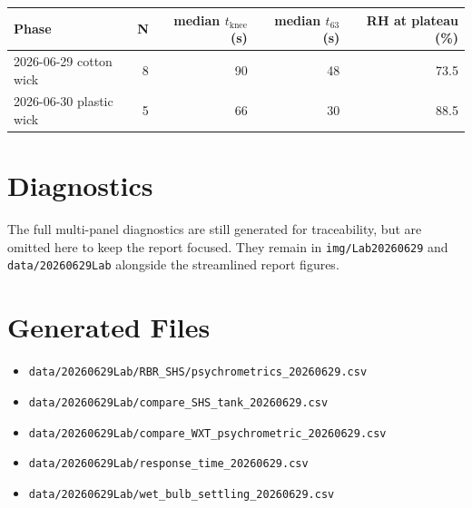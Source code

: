 \documentclass[11pt,letterpaper]{article}
\begin{document}
\begin{center}
\begin{tabular}{lrrrr}
\toprule
Phase & N & median $t_\text{knee}$ (s) & median $t_{63}$ (s) & RH at plateau (\%) \\
\midrule
2026-06-29 cotton wick & 8 & 90 & 48 & 73.5 \\
2026-06-30 plastic wick & 5 & 66 & 30 & 88.5 \\
\bottomrule
\end{tabular}
\end{center}

\section{Diagnostics}

The full multi-panel diagnostics are still generated for traceability, but are
omitted here to keep the report focused. They remain in
\texttt{img/Lab20260629} and \texttt{data/20260629Lab} alongside the
streamlined report figures.

\section{Generated Files}

\begin{itemize}
  \item \texttt{data/20260629Lab/RBR\_SHS/psychrometrics\_20260629.csv}
  \item \texttt{data/20260629Lab/compare\_SHS\_tank\_20260629.csv}
  \item \texttt{data/20260629Lab/compare\_WXT\_psychrometric\_20260629.csv}
  \item \texttt{data/20260629Lab/response\_time\_20260629.csv}
  \item \texttt{data/20260629Lab/wet\_bulb\_settling\_20260629.csv}
\end{itemize}
\end{document}
